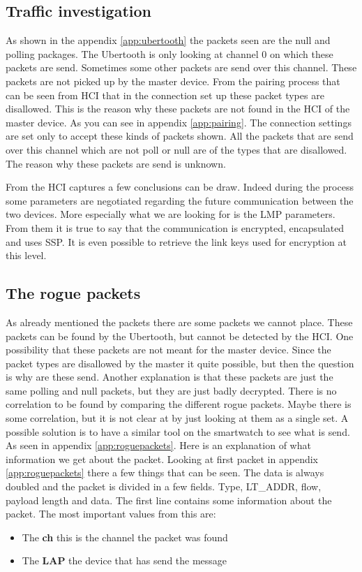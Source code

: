 \subsection{Traffic investigation}
As shown in the appendix \ref{app:ubertooth} the packets seen are the null and polling packages. The Ubertooth is only looking at channel 0 on which these packets are send. Sometimes some other packets are send over this channel. These packets are not picked up by the master device. From the pairing process that can be seen from HCI that in the connection set up these packet types are disallowed. This is the reason why these packets are not found in the HCI of the master device. As you can see in appendix \ref{app:pairing}. The connection settings are set only to accept these kinds of packets shown. All the packets that are send over this channel which are not poll or null are of the types that are disallowed. \pend
The reason why these packets are send is unknown.

From the HCI captures a few conclusions can be draw. Indeed during the process some parameters are negotiated regarding the future communication between the two devices. More especially what we are looking for is the LMP parameters. From them it is true to say that the communication is encrypted, encapsulated and uses SSP. It is even possible to retrieve the link keys used for encryption at this level.

\subsection{The rogue packets}
As already mentioned the packets there are some packets we cannot place. These packets can be found by the Ubertooth, but cannot be detected by the HCI. One possibility that these packets are not meant for the master device. Since the packet types are disallowed by the master it quite possible, but then the question is why are these send. Another explanation is that these packets are just the same polling and null packets, but they are just badly decrypted. There is no correlation to be found by comparing the different rogue packets. Maybe there is some correlation, but it is not clear at by just looking at them as a single set. A possible solution is to have a similar tool on the smartwatch to see what is send. As seen in appendix \ref{app:roguepackets}. Here is an explanation of what information we get about the packet.
Looking at first packet in appendix \ref{app:roguepackets} there a few things that can be seen. The data is always doubled and the packet is divided in a few fields. Type, LT\_ADDR, flow, payload length and data. The first line contains some information about the packet. The most important values from this are:
\begin{itemize} 
\item The \textbf{ch} this is the channel the packet was found 
\item The \textbf{LAP} the device that has send the message
\end{itemize}
